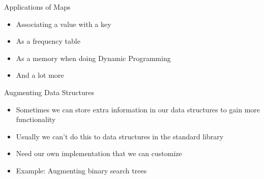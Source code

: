 \documentclass{beamer}
\begin{document}
\begin{frame}{Applications of Maps}
    \begin{itemize}
        \item<1-> Associating a value with a key
        \item<2-> As a frequency table
        \item<3-> As a memory when doing Dynamic Programming
        \item<4-> And a lot more
    \end{itemize}
\end{frame}

\begin{frame}{Augmenting Data Structures}
    \begin{itemize}
        \item<1-> Sometimes we can store extra information in our data structures to gain more functionality
        \item<2-> Usually we can't do this to data structures in the standard library
        \item<3-> Need our own implementation that we can customize
        \item<4-> Example: Augmenting binary search trees
    \end{itemize}
\end{frame}
\end{document}
